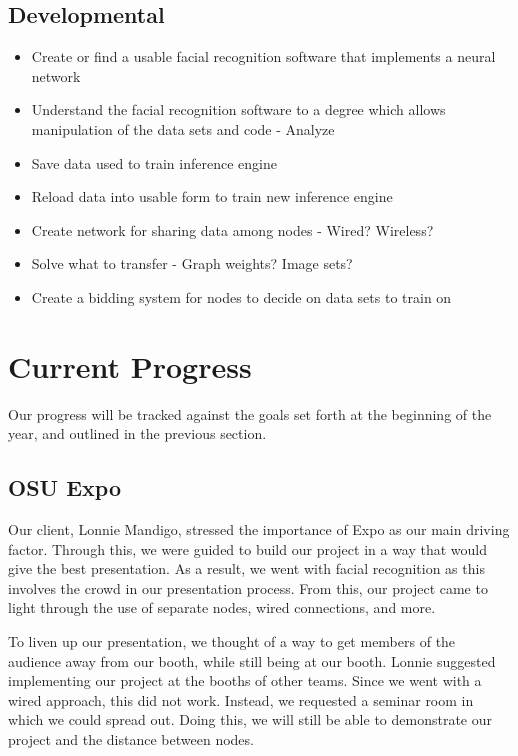 \documentclass[onecolumn, draftclsnofoot,10pt, compsoc]{IEEEtran}
\begin{document}
    \subsection{Developmental}
        \begin{itemize}
            \item Create or find a usable facial recognition software that implements a neural network
            \item Understand the facial recognition software to a degree which allows manipulation of the data sets and code - Analyze
            \item Save data used to train inference engine 
            \item Reload data into usable form to train new inference engine
            \item Create network for sharing data among nodes - Wired? Wireless?
            \item Solve what to transfer - Graph weights? Image sets?
            \item Create a bidding system for nodes to decide on data sets to train on
        \end{itemize}

\section{Current Progress}
Our progress will be tracked against the goals set forth at the beginning of the year, and outlined in the previous section.

    \subsection{OSU Expo}
    Our client, Lonnie Mandigo, stressed the importance of Expo as our main driving factor. Through this, we were guided to build our project in a way that would give the best presentation. As a result, we went with facial recognition as this involves the crowd in our presentation process. From this, our project came to light through the use of separate nodes, wired connections, and more.
    
    To liven up our presentation, we thought of a way to get members of the audience away from our booth, while still being at our booth. Lonnie suggested implementing our project at the booths of other teams. Since we went with a wired approach, this did not work. Instead, we requested a seminar room in which we could spread out. Doing this, we will still be able to demonstrate our project and the distance between nodes.
    
\end{document}
